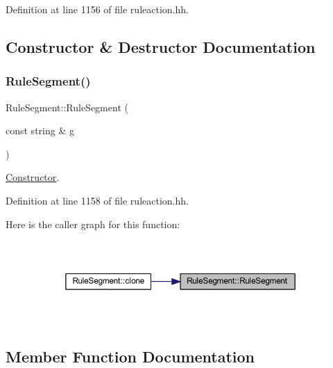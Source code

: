 Definition at line 1156 of file ruleaction.\+hh.



\subsection{Constructor \& Destructor Documentation}
\mbox{\label{class_rule_segment_a7f34a2aa947738210be8837d3e42a268}} 
\subsubsection{\texorpdfstring{RuleSegment()}{RuleSegment()}}
{\footnotesize\ttfamily Rule\+Segment\+::\+Rule\+Segment (\begin{DoxyParamCaption}\item[{const string \&}]{g }\end{DoxyParamCaption})\hspace{0.3cm}{\ttfamily [inline]}}



\mbox{\hyperlink{class_constructor}{Constructor}}. 



Definition at line 1158 of file ruleaction.\+hh.

Here is the caller graph for this function\+:
\nopagebreak
\begin{figure}[H]
\begin{center}
\leavevmode
\includegraphics[width=350pt]{class_rule_segment_a7f34a2aa947738210be8837d3e42a268_icgraph}
\end{center}
\end{figure}


\subsection{Member Function Documentation}
\mbox{\label{class_rule_segment_ae9c0b0fb9076088f2adf5342f8e100f6}} 
